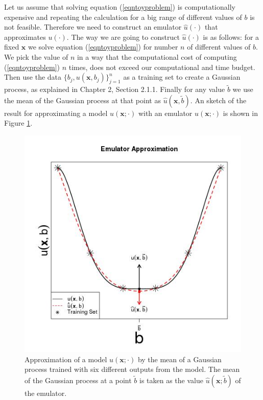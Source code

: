 \documentclass[12pt]{book}
\newcommand{\x}{\textbf{x}}
\begin{document}
Let us assume that solving
equation (\ref{eqntoyproblem}) is computationally expensive and repeating the calculation for a big range of 
different values of $b$
is not feasible. Therefore we need to construct an emulator $\widehat{u}(\cdot)$ that approximates $u(\cdot)$. 
The way we are going to construct $\widehat{u}(\cdot)$ is as follows: for a fixed $\x$ we solve equation 
(\ref{eqntoyproblem}) for   number $n$ of different values of  $b$. We pick the value of $n$ in a way
that the computational cost of computing (\ref{eqntoyproblem}) $n$ times, does not exceed our
computational and time budget. Then use the data $\{b_{j},u(\x,b_{j})\}_{j=1}^{n}$  as a 
training set to create a Gaussian process, as explained in Chapter 2, Section 2.1.1. Finally
for any value $\tilde{b}$ we use the mean of the Gaussian process at that point as $\widehat{u}(\x,\tilde{b})$.
An sketch of the result for approximating a model $u(\x;\cdot)$ with an emulator
$\widehat{u}(\x;\cdot)$ is shown
in Figure \ref{figGPCreation}.

\begin{figure}[H]
\centering
\includegraphics[scale=0.50]{./FigChap3/emulatorApproximation}
\caption{Approximation of a model $u(\x;\cdot)$ by the mean of a Gaussian process trained
with six  different  outputs from the model. The mean of the Gaussian process at a point $\tilde{b}$ is taken
as the value $\widehat{u}(\x;\tilde{b})$ of the emulator.}
\label{figGPCreation}
\end{figure}
\end{document}
